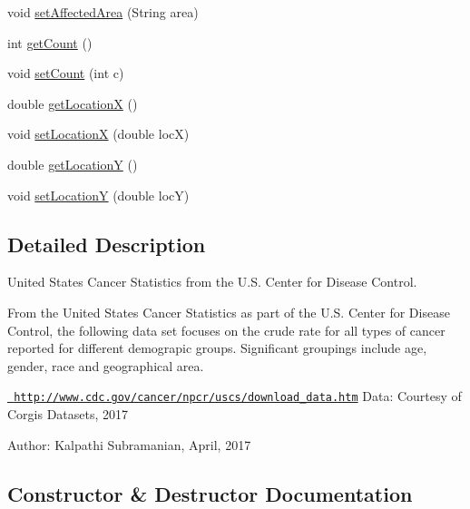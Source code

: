 \begin{DoxyCompactItemize}
\item 
void \mbox{\hyperlink{classbridges_1_1data__src__dependent_1_1_cancer_incidence_a9c7f2d303da9498e5e6145439c5a6fbc}{set\+Affected\+Area}} (String area)
\item 
int \mbox{\hyperlink{classbridges_1_1data__src__dependent_1_1_cancer_incidence_a8769cb18ddb590dc41a04a220174f3df}{get\+Count}} ()
\item 
void \mbox{\hyperlink{classbridges_1_1data__src__dependent_1_1_cancer_incidence_a18099439ef6e35cf240b06f0e0158c72}{set\+Count}} (int c)
\item 
double \mbox{\hyperlink{classbridges_1_1data__src__dependent_1_1_cancer_incidence_a24aa8144dcacd93a26c3c033471666df}{get\+LocationX}} ()
\item 
void \mbox{\hyperlink{classbridges_1_1data__src__dependent_1_1_cancer_incidence_a384149c413173fba51adad1b1769797a}{set\+LocationX}} (double locX)
\item 
double \mbox{\hyperlink{classbridges_1_1data__src__dependent_1_1_cancer_incidence_a53b56a9931a1d02ee356c6258e245aa8}{get\+LocationY}} ()
\item 
void \mbox{\hyperlink{classbridges_1_1data__src__dependent_1_1_cancer_incidence_a14c6921a71834c14d561bc7f2aa8a18e}{set\+LocationY}} (double locY)
\end{DoxyCompactItemize}


\subsection{Detailed Description}
United States Cancer Statistics from the U.\+S. Center for Disease Control. 

From the United States Cancer Statistics as part of the U.\+S. Center for Disease Control, the following data set focuses on the crude rate for all types of cancer reported for different demograpic groups. Significant groupings include age, gender, race and geographical area.

\href{http://www.cdc.gov/cancer/npcr/uscs/download_data.htm}{\texttt{ http\+://www.\+cdc.\+gov/cancer/npcr/uscs/download\+\_\+data.\+htm}} Data\+: Courtesy of Corgis Datasets, 2017

Author\+: Kalpathi Subramanian, April, 2017 

\subsection{Constructor \& Destructor Documentation}
\mbox{\label{classbridges_1_1data__src__dependent_1_1_cancer_incidence_a92db1eb4292c77f07619019587caf5cc}} 
